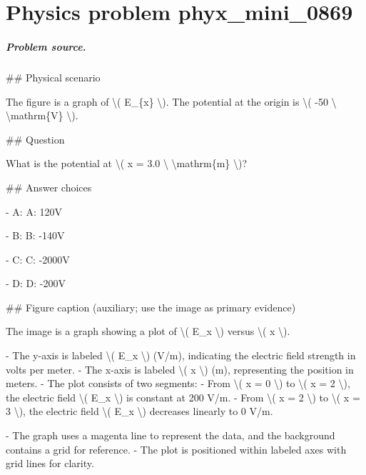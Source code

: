 
\chapter{Physics problem phyx\_mini\_0869}
\label{ch:PhyXMiniProblems_problem_phyx_mini_0869}

\paragraph{Problem source.}
\#\# Physical scenario

The figure is a graph of \textbackslash{}( E\_\{x\} \textbackslash{}). The potential at the origin is \textbackslash{}( -50 \textbackslash{} \textbackslash{}mathrm\{V\} \textbackslash{}).

\#\# Question

What is the potential at \textbackslash{}( x = 3.0 \textbackslash{} \textbackslash{}mathrm\{m\} \textbackslash{})?

\#\# Answer choices

- A: A: 120V

- B: B: -140V

- C: C: -2000V

- D: D: -200V

\#\# Figure caption (auxiliary; use the image as primary evidence)

The image is a graph showing a plot of \textbackslash{}( E\_x \textbackslash{}) versus \textbackslash{}( x \textbackslash{}). 

- The y-axis is labeled \textbackslash{}( E\_x \textbackslash{}) (V/m), indicating the electric field strength in volts per meter.
- The x-axis is labeled \textbackslash{}( x \textbackslash{}) (m), representing the position in meters.
- The plot consists of two segments:
  - From \textbackslash{}( x = 0 \textbackslash{}) to \textbackslash{}( x = 2 \textbackslash{}), the electric field \textbackslash{}( E\_x \textbackslash{}) is constant at 200 V/m.
  - From \textbackslash{}( x = 2 \textbackslash{}) to \textbackslash{}( x = 3 \textbackslash{}), the electric field \textbackslash{}( E\_x \textbackslash{}) decreases linearly to 0 V/m. 

- The graph uses a magenta line to represent the data, and the background contains a grid for reference.
- The plot is positioned within labeled axes with grid lines for clarity.

